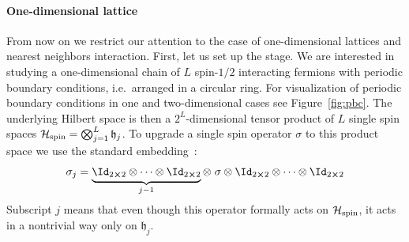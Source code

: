 \paragraph{One-dimensional lattice}From now on we restrict our attention to the case of one-dimensional lattices and
nearest neighbors interaction. First, let us set up the stage. We are interested in studying
a one-dimensional chain of \(L\) spin-\(1/2\) interacting fermions with periodic boundary conditions,
i.e.\ arranged in a circular ring. For visualization of periodic boundary conditions in 
one and two-dimensional cases see Figure~\ref{fig:pbc}.
The underlying Hilbert space is then a \(2^L\)-dimensional
tensor product of \(L\) single spin spaces \(\mathcal{H}_{\textrm{spin}} = \bigotimes_{j=1}^{L}\mathfrak{h}_j\).
To upgrade a single spin operator \(\sigma\) to this product space we use the
standard embedding~\autocite{Ng2011HeisenbergM}:
\begin{equation}
    \sigma_j = \underbrace{\Id_{2\cross 2} \otimes \cdots \otimes \Id_{2\cross 2}}_{j-1}
     \otimes \;\sigma \otimes \Id_{2\cross 2} \otimes \cdots \otimes \Id_{2\cross 2}
    \label{eq:embedding}
\end{equation}
Subscript \(j\) means that even though this operator formally acts on
\(\mathcal{H}_{\textrm{spin}}\), it acts in a nontrivial way only on \(\mathfrak{h}_j\). 

